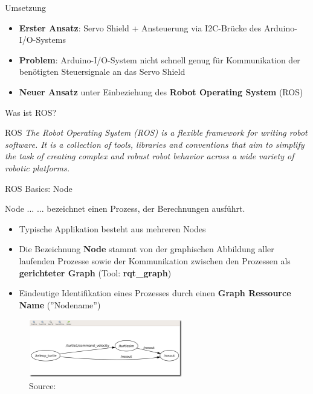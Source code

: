 \documentclass{beamer}
\begin{document}
\begin{frame}{Umsetzung}
\begin{itemize}
	\item \textbf{Erster Ansatz}: Servo Shield + Ansteuerung via I2C-Br\"ucke des Arduino-I/O-Systems
\end{itemize}
\begin{itemize}
	\item \textbf{Problem}: Arduino-I/O-System nicht schnell genug f\"ur Kommunikation der ben\"otigten Steuersignale an das Servo Shield
\end{itemize}
\begin{itemize}
	\item \textbf{Neuer Ansatz} unter Einbeziehung des \textbf{Robot Operating System} (ROS)
\end{itemize}
\end{frame}
\begin{frame}{Was ist ROS?}
\begin{alertblock}{ROS}
\textit{The Robot Operating System (ROS) is a flexible framework for writing robot software. It is a collection of tools, libraries and conventions that aim to simplify the task of creating complex and robust robot behavior across a wide variety of robotic platforms.}
\end{alertblock}
\end{frame}
\begin{frame}{ROS Basics: Node}
\begin{alertblock}{Node ...}
... bezeichnet einen Prozess, der Berechnungen ausf\"uhrt.
\end{alertblock}
\begin{itemize}
	\item Typische Applikation besteht aus mehreren Nodes
	\item Die Bezeichnung \textbf{Node} stammt von der graphischen Abbildung aller laufenden Prozesse sowie der Kommunikation zwischen den Prozessen als \textbf{gerichteter Graph} (Tool: \textbf{rqt\_graph})
	\item Eindeutige Identifikation eines Prozesses durch einen \textbf{Graph Ressource Name} (''Nodename'')
\end{itemize}
\begin{figure}[H]
	\centering
	\includegraphics[width=0.6\textwidth]{./images/rxgraph-turtle-key.png}
	\caption{Source: \cite{ROS:2015:Online}}
	\label{fig:ros_graph}
\end{figure}
\end{frame}
\end{document}
